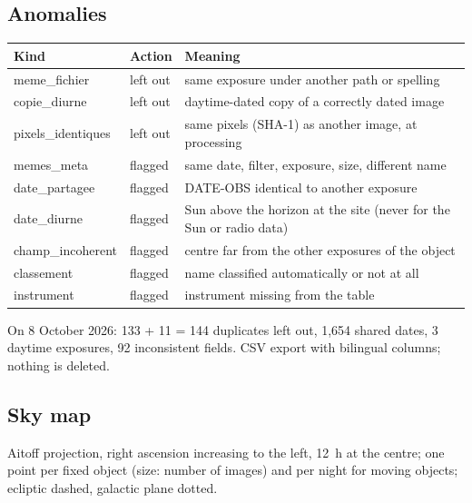 \subsection{Anomalies}
\begin{center}\small
\begin{tabularx}{\linewidth}{@{}>{\ttfamily}llX@{}}
\toprule
\normalfont\textbf{Kind} & \textbf{Action} & \textbf{Meaning}\\
\midrule
meme\_fichier & left out & same exposure under another path or spelling\\
copie\_diurne & left out & daytime-dated copy of a correctly dated image\\
pixels\_identiques & left out & same pixels (SHA-1) as another image, at processing\\
memes\_meta & flagged & same date, filter, exposure, size, different name\\
date\_partagee & flagged & DATE-OBS identical to another exposure\\
date\_diurne & flagged & Sun above the horizon at the site (never for the Sun or radio data)\\
champ\_incoherent & flagged & centre far from the other exposures of the object\\
classement & flagged & name classified automatically or not at all\\
instrument & flagged & instrument missing from the table\\
\bottomrule
\end{tabularx}
\end{center}
On 8 October 2026: 133 + 11 = 144 duplicates left out, 1,654 shared dates, 3 daytime exposures, 92 inconsistent
fields. CSV export with bilingual columns; nothing is deleted.

\subsection{Sky map}
Aitoff projection, right ascension increasing to the left, 12~h at the centre; one point per fixed object (size:
number of images) and per night for moving objects; ecliptic dashed, galactic plane dotted.

